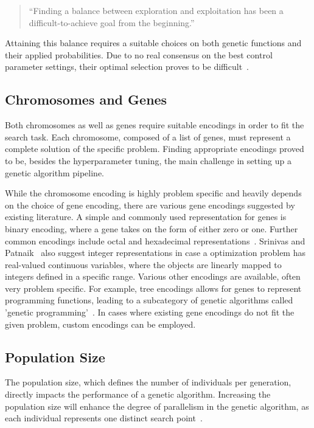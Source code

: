 \begin{quote}
	\begin{em}
		\enquote{Finding a balance between exploration and exploitation has been a difficult-to-achieve goal from the beginning.}~\cite{kacprzyk_parameter_2007}
	\end{em}
\end{quote}

Attaining this balance requires a suitable choices on both genetic functions and their applied probabilities. Due to no real consensus on the best control parameter settings, their optimal selection proves to be difficult~\cite{kacprzyk_parameter_2007}.

\subsection{Chromosomes and Genes}
\label{sect:foundations:chromosomes_and_genes}
Both chromosomes as well as genes require suitable encodings in order to fit the search task. Each chromosome, composed of a list of genes, must represent a complete solution of the specific problem. Finding appropriate encodings proved to be, besides the hyperparameter tuning, the main challenge in setting up a genetic algorithm pipeline.

While the chromosome encoding is highly problem specific and heavily depends on the choice of gene encoding, there are various gene encodings suggested by existing literature. A simple and commonly used representation for genes is binary encoding, where a gene takes on the form of either zero or one. Further common encodings include octal and hexadecimal representations~\cite{srinivas_genetic_1994,katoch_review_2021}. Srinivas and Patnaik~\cite{srinivas_genetic_1994} also suggest integer representations in case a optimization problem has real-valued continuous variables, where the objects are linearly mapped to integers defined in a specific range. Various other encodings are available, often very problem specific. For example, tree encodings allows for genes to represent programming functions, leading to a subcategory of genetic algorithms called 'genetic programming'~\cite{katoch_review_2021}. In cases where existing gene encodings do not fit the given problem, custom encodings can be employed.

\subsection{Population Size}
The population size, which defines the number of individuals per generation, directly impacts the performance of a genetic algorithm. Increasing the population size will enhance the degree of parallelism in the genetic algorithm, as each individual represents one distinct search point~\cite{mills_determining_2015}.

